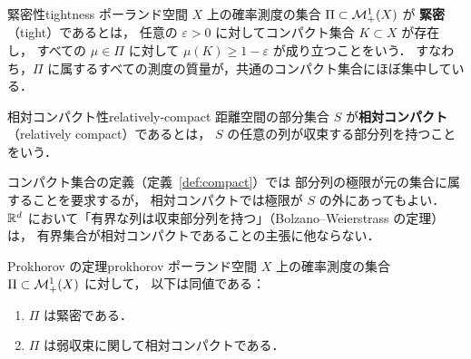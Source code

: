 \begin{definition}{緊密性}{tightness}
  ポーランド空間 $X$ 上の確率測度の集合 $\Pi \subset \mathcal{M}_+^1(X)$ が
  \textbf{緊密}（tight）であるとは，
  任意の $\varepsilon > 0$ に対してコンパクト集合 $K \subset X$ が存在し，
  すべての $\mu \in \Pi$ に対して $\mu(K) \geq 1 - \varepsilon$ が成り立つことをいう．
  すなわち，$\Pi$ に属するすべての測度の質量が，共通のコンパクト集合にほぼ集中している．
\end{definition}

\begin{definition}{相対コンパクト性}{relatively-compact}
  距離空間の部分集合 $S$ が\textbf{相対コンパクト}（relatively compact）であるとは，
  $S$ の任意の列が収束する部分列を持つことをいう．
\end{definition}

コンパクト集合の定義（定義~\ref{def:compact}）では
部分列の極限が元の集合に属することを要求するが，
相対コンパクトでは極限が $S$ の外にあってもよい．
$\mathbb{R}^d$ において「有界な列は収束部分列を持つ」（Bolzano--Weierstrass の定理）は，
有界集合が相対コンパクトであることの主張に他ならない．

\begin{theorem}{Prokhorov の定理}{prokhorov}
  ポーランド空間 $X$ 上の確率測度の集合 $\Pi \subset \mathcal{M}_+^1(X)$ に対して，
  以下は同値である：
  \begin{enumerate}
    \item $\Pi$ は緊密である．
    \item $\Pi$ は弱収束に関して相対コンパクトである．
  \end{enumerate}
\end{theorem}

